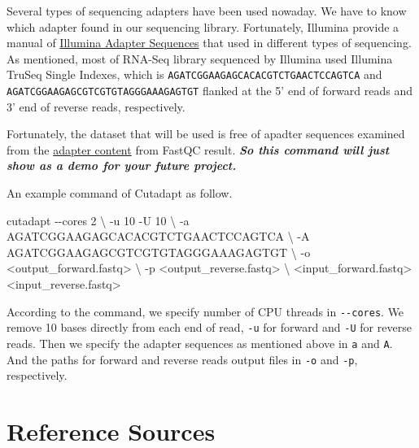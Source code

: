 \documentclass[
  letterpaper,
  DIV=11,
  numbers=noendperiod]{scrreprt}
\newenvironment{Shaded}{\begin{snugshade}}{\end{snugshade}}
\newcommand{\AttributeTok}[1]{\textcolor[rgb]{0.40,0.45,0.13}{#1}}
\newcommand{\DataTypeTok}[1]{\textcolor[rgb]{0.68,0.00,0.00}{#1}}
\newcommand{\ExtensionTok}[1]{\textcolor[rgb]{0.00,0.23,0.31}{#1}}
\newcommand{\NormalTok}[1]{\textcolor[rgb]{0.00,0.23,0.31}{#1}}
\newcommand{\OperatorTok}[1]{\textcolor[rgb]{0.37,0.37,0.37}{#1}}
\begin{document}
Several types of sequencing adapters have been used nowaday. We have to
know which adapter found in our sequencing library. Fortunately,
Illumina provide a manual of
\href{https://support.illumina.com/downloads/illumina-adapter-sequences-document-1000000002694.html}{Illumina
Adapter Sequences} that used in different types of sequencing. As
mentioned, most of RNA-Seq library sequenced by Illumina used Illumina
TruSeq Single Indexes, which is
\texttt{AGATCGGAAGAGCACACGTCTGAACTCCAGTCA} and
\texttt{AGATCGGAAGAGCGTCGTGTAGGGAAAGAGTGT} flanked at the 5' end of
forward reads and 3' end of reverse reads, respectively.

Fortunately, the dataset that will be used is free of apadter sequences
examined from the \protect\hyperlink{adapter-content}{adapter content}
from FastQC result. \textbf{\emph{So this command will just show as a
demo for your future project.}}

An example command of Cutadapt as follow.

\begin{Shaded}
\begin{Highlighting}[]
\ExtensionTok{cutadapt} \AttributeTok{{-}{-}cores}\NormalTok{ 2 }\DataTypeTok{\textbackslash{}}
\NormalTok{{-}u 10 }\AttributeTok{{-}U}\NormalTok{ 10 }\DataTypeTok{\textbackslash{}}
\NormalTok{{-}a AGATCGGAAGAGCACACGTCTGAACTCCAGTCA }\DataTypeTok{\textbackslash{}}
\NormalTok{{-}A AGATCGGAAGAGCGTCGTGTAGGGAAAGAGTGT }\DataTypeTok{\textbackslash{}}
\NormalTok{{-}o }\OperatorTok{\textless{}}\NormalTok{output\_forward.fastq}\OperatorTok{\textgreater{}} \DataTypeTok{\textbackslash{}}
\NormalTok{{-}p }\OperatorTok{\textless{}}\NormalTok{output\_reverse.fastq}\OperatorTok{\textgreater{}} \DataTypeTok{\textbackslash{}}
\OperatorTok{\textless{}}\NormalTok{input\_forward.fastq}\OperatorTok{\textgreater{}} \OperatorTok{\textless{}}\NormalTok{input\_reverse.fastq}\OperatorTok{\textgreater{}}
\end{Highlighting}
\end{Shaded}

According to the command, we specify number of CPU threads in
\texttt{-\/-cores}. We remove 10 bases directly from each end of read,
\texttt{-u} for forward and \texttt{-U} for reverse reads. Then we
specify the adapter sequences as mentioned above in \texttt{a} and
\texttt{A}. And the paths for forward and reverse reads output files in
\texttt{-o} and \texttt{-p}, respectively.

\hypertarget{reference-sources-1}{%
\section{Reference Sources}\label{reference-sources-1}}
\end{document}
